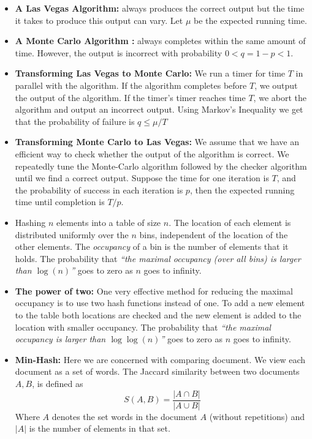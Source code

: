 \documentclass[10pt,twocolumn]{article}
\begin{document}
\begin{itemize}
\item {\bf A Las Vegas Algorithm:} always produces the correct output
  but the time it takes to produce this output can vary. Let $\mu$ be
  the expected running time.
\item {\bf A Monte Carlo Algorithm :} always completes within the same
  amount of time. However, the output is incorrect with probability
  $0<q=1-p<1$.
\item {\bf Transforming Las Vegas to Monte Carlo:} We run a timer for
  time $T$ in parallel with the algorithm. If the algorithm completes
  before $T$, we output the output of the algorithm. If the timer's
  timer reaches time $T$, we abort the algorithm and output an
  incorrect output. Using Markov's Inequality we get that the probability
  of failure is $q \leq \mu/T$
\item {\bf Transforming Monte Carlo to Las Vegas:} We assume that we
  have an efficient way to check whether the output of the algorithm
  is correct. We repeatedly tune the Monte-Carlo algorithm followed by the
  checker algorithm until we find a correct output. Suppose the time
  for one iteration is $T$, and the probability of success in each
  iteration is $p$, then the expected running time until completion is
  $T/p$.
\item Hashing $n$ elements into a table of size $n$. The location of
  each element is distributed uniformly over the $n$ bins, independent
  of the location of the other elements. The {\em occupancy} of a bin
  is the number of elements that it holds.  The probability that {\em
    ``the maximal occupancy (over all bins) is larger than
    $\log(n)$''} goes to zero as $n$ goes to infinity.
\item {\bf The power of two:} One very effective method for reducing
  the maximal occupancy is to use two hash functions instead of
  one. To add a new element to the table both locations are checked
  and the new element is added to the location with smaller
  occupancy. The probability that {\em ``the maximal occupancy is
    larger than $\log \log(n)$''} goes to zero as $n$ goes to infinity.
\item {\bf Min-Hash:} Here we are concerned with comparing
  document. We view each document as a set of words. The Jaccard
  similarity between two documents $A,B$, is defined as
\[ S(A,B) = \frac{|A \cap B|}{|A \cup B|} \]
Where $A$ denotes the set words in the document $A$ (without
repetitions) and $|A|$ is the number of elements in that set.


\end{itemize}
\end{document}
